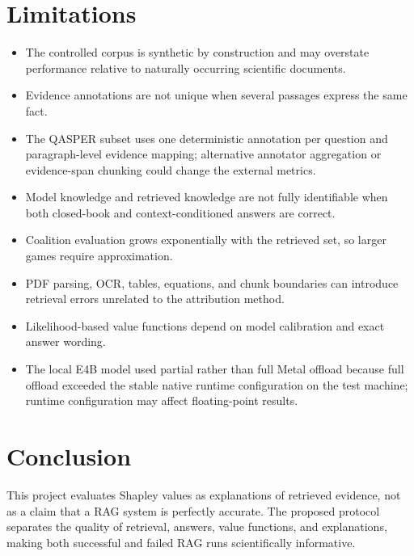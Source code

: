 \documentclass[10pt]{article}
\begin{document}
\section{Limitations}
\begin{itemize}
  \item The controlled corpus is synthetic by construction and may overstate
  performance relative to naturally occurring scientific documents.
  \item Evidence annotations are not unique when several passages express the
  same fact.
  \item The QASPER subset uses one deterministic annotation per question and
  paragraph-level evidence mapping; alternative annotator aggregation or
  evidence-span chunking could change the external metrics.
  \item Model knowledge and retrieved knowledge are not fully identifiable
  when both closed-book and context-conditioned answers are correct.
  \item Coalition evaluation grows exponentially with the retrieved set, so
  larger games require approximation.
  \item PDF parsing, OCR, tables, equations, and chunk boundaries can introduce
  retrieval errors unrelated to the attribution method.
  \item Likelihood-based value functions depend on model calibration and exact
  answer wording.
  \item The local E4B model used partial rather than full Metal offload because
  full offload exceeded the stable native runtime configuration on the test
  machine; runtime configuration may affect floating-point results.
\end{itemize}

\section{Conclusion}
This project evaluates Shapley values as explanations of retrieved evidence,
not as a claim that a RAG system is perfectly accurate. The proposed protocol
separates the quality of retrieval, answers, value functions, and explanations,
making both successful and failed RAG runs scientifically informative.





\end{document}
